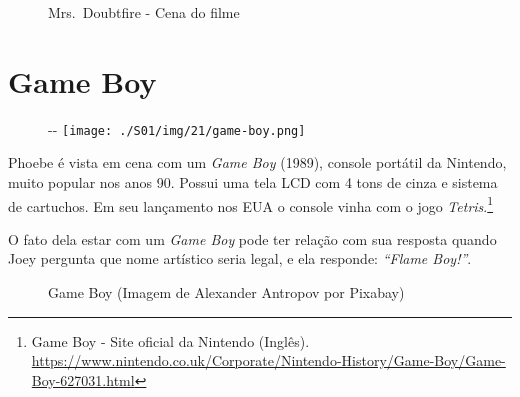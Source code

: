 \begin{figure}
  \centering
    \caption{Mrs. Doubtfire - Cena do filme\label{fig:mrs-doubtfire-cena-do-filme}}
\end{figure}

\hypertarget{game-boy}{%
\section{Game Boy}\label{game-boy}}

\begin{figure}[!ht]
  \begin{adjustwidth}{-\oddsidemargin-1in}{-\rightmargin}
    \centering
    \texttt{[image: ./S01/img/21/game-boy.png]}
  \end{adjustwidth}
\end{figure}

Phoebe é vista em cena com um \emph{Game Boy} (1989), console portátil
da Nintendo, muito popular nos anos 90. Possui uma tela LCD com 4 tons
de cinza e sistema de cartuchos. Em seu lançamento nos EUA o console
vinha com o jogo \emph{Tetris}.\footnote{\sloppy Game Boy - Site oficial da Nintendo (Inglês). \url{https://www.nintendo.co.uk/Corporate/Nintendo-History/Game-Boy/Game-Boy-627031.html}}

\saveparinfos
\noindent
\begin{minipage}[c]{0.5\textwidth}\useparinfo

O fato dela estar com um \emph{Game Boy} pode ter relação com sua
resposta quando Joey pergunta que nome artístico seria legal, e ela
responde: \emph{``Flame Boy!''}.

\end{minipage}\hfill
\begin{minipage}[c]{0.5\textwidth}

\begin{figure}
  \centering
    \caption{Game Boy (Imagem de Alexander Antropov por Pixabay)\label{fig:game-boy-imagem-de-alexander-antropov-por-pixabay}}
\end{figure}

\end{minipage}

